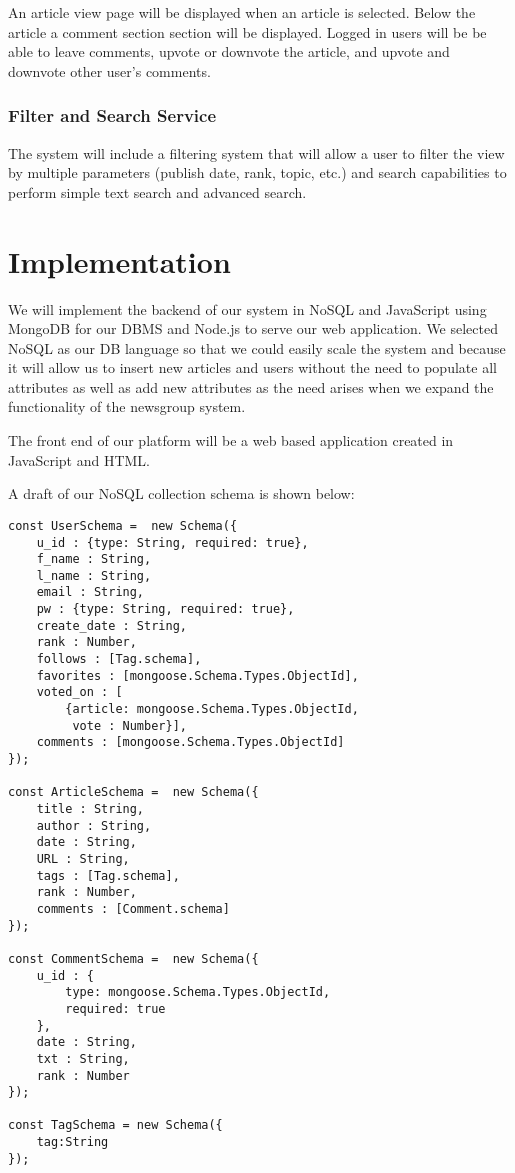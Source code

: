 \documentclass{report}
\begin{document}
An article view page will be displayed when an article is selected.  Below the article a comment section section will be displayed.  Logged in users will be be able to leave comments, upvote or downvote the article, and upvote and downvote other user's comments. 

\subsubsection*{Filter and Search Service}
The system will include a filtering system that will allow a user to filter the view by multiple parameters (publish date, rank, topic, etc.) and search capabilities to perform simple text search and advanced search.

\section*{Implementation}

We will implement the backend of our system in NoSQL and JavaScript using MongoDB for our DBMS and Node.js to serve our web application. We selected NoSQL as our DB language so that we could easily scale the system and because it will allow us to insert new articles and users without the need to populate all attributes as well as add new attributes as the need arises when we expand the functionality of the newsgroup system. 

The front end of our platform will be a web based application created in JavaScript and HTML. 

A draft of our NoSQL collection schema is shown below: 

\begin{lstlisting}
const UserSchema =  new Schema({
    u_id : {type: String, required: true},
    f_name : String,
    l_name : String,
    email : String,
    pw : {type: String, required: true},
    create_date : String,
    rank : Number,
    follows : [Tag.schema],
    favorites : [mongoose.Schema.Types.ObjectId],
    voted_on : [
        {article: mongoose.Schema.Types.ObjectId,
         vote : Number}],
    comments : [mongoose.Schema.Types.ObjectId]
});

const ArticleSchema =  new Schema({
    title : String,
    author : String,
    date : String,
    URL : String,
    tags : [Tag.schema],
    rank : Number,
    comments : [Comment.schema]
});

const CommentSchema =  new Schema({
    u_id : {
        type: mongoose.Schema.Types.ObjectId, 
        required: true
    },
    date : String, 
    txt : String,
    rank : Number
});

const TagSchema = new Schema({
    tag:String
});
\end{lstlisting}
\newpage
\end{document}
